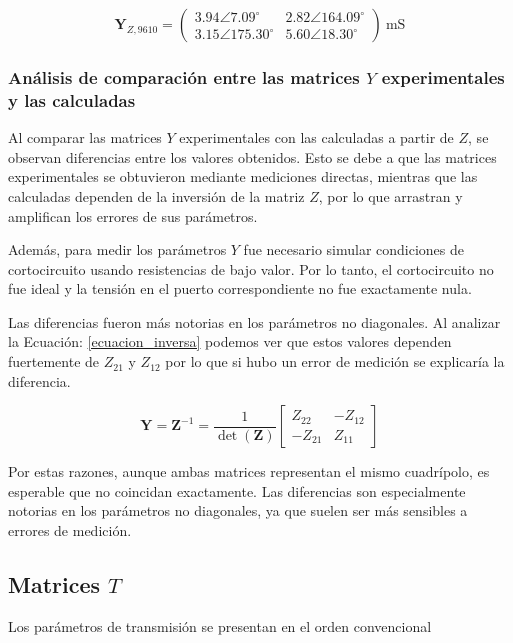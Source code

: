 \[
\mathbf{Y}_{Z,9610} =
\begin{pmatrix}
3.94 \angle 7.09^\circ & 2.82 \angle 164.09^\circ \\
3.15 \angle 175.30^\circ & 5.60 \angle 18.30^\circ
\end{pmatrix}
\ \mathrm{mS}
\]
\subsubsection{Análisis de comparación entre las matrices $Y$ experimentales y las calculadas}

Al comparar las matrices $Y$ experimentales con las calculadas a partir de $Z$, se observan diferencias entre los valores obtenidos. Esto se debe a que las matrices experimentales se obtuvieron mediante mediciones directas, mientras que las calculadas dependen de la inversión de la matriz $Z$, por lo que arrastran y amplifican los errores de sus parámetros.

Además, para medir los parámetros $Y$ fue necesario simular condiciones de cortocircuito usando resistencias de bajo valor. Por lo tanto, el cortocircuito no fue ideal y la tensión en el puerto correspondiente no fue exactamente nula.

Las diferencias fueron más notorias en los parámetros no diagonales. Al analizar la Ecuación: \ref{ecuacion_inversa} podemos ver que estos valores dependen fuertemente de $Z_{21}$ y $Z_{12}$ por lo que si hubo un error de medición se explicaría la diferencia. 

\begin{equation}
    \mathbf{Y}=\mathbf{Z}^{-1}
    =
    \frac{1}{\det(\mathbf{Z})}
    \begin{bmatrix}
        Z_{22} & -Z_{12}\\
        -Z_{21} & Z_{11}
    \end{bmatrix}
    \label{ecuacion_inversa}
\end{equation}


Por estas razones, aunque ambas matrices representan el mismo cuadrípolo, es esperable que no coincidan exactamente. Las diferencias son especialmente notorias en los parámetros no diagonales, ya que suelen ser más sensibles a errores de medición.


\subsection{Matrices $T$}

Los parámetros de transmisión se presentan en el orden convencional

